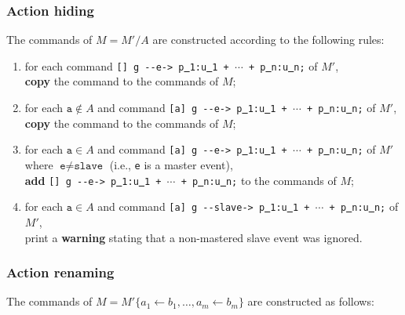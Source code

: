 \documentclass{article}
\newcommand{\arci}[1]{{-}{-}{#1}->}
\renewcommand{\_}{\underline{~}}
\newcommand{\code}[1]{\texttt{#1}}
\begin{document}
\subsubsection*{Action hiding}

The commands of $M = M'/A$ are constructed according to the following rules:

\begin{enumerate}
	
	\item for each command \code{[] g \arci{e} p\_1:u\_1 + $\cdots$ + p\_n:u\_n;} of $M'$, \\ 
	\textbf{copy} the command to the commands of $M$;
	
    \item for each $\code{a} \not\in A$ and command \code{[a] g \arci{e}  p\_1:u\_1 + $\cdots$ + p\_n:u\_n;} of $M'$, \\ 
	\textbf{copy} the command to the commands of $M$;
	
	\item for each $\code{a} \in A$ and command \code{[a] g \arci{e}  p\_1:u\_1 + $\cdots$ + p\_n:u\_n;} of $M'$ where $\code{e} \neq \code{slave}$ (i.e., \code{e} is a master event), \\
\textbf{add} \code{[] g \arci{e}  p\_1:u\_1 + $\cdots$ + p\_n:u\_n;} to the commands of $M$;

    \item\label{it:non-mastered-slave} for each $\code{a} \in A$ and command \code{[a] g \arci{slave}  p\_1:u\_1 + $\cdots$ + p\_n:u\_n;} of $M'$, \\ print a \textbf{warning} stating that a non-mastered slave event was ignored.
\end{enumerate}

\subsubsection*{Action renaming}

The commands of $M= M'\{a_1 \leftarrow b_1, \ldots, a_m \leftarrow b_m \}$ are constructed as follows:
\end{document}
